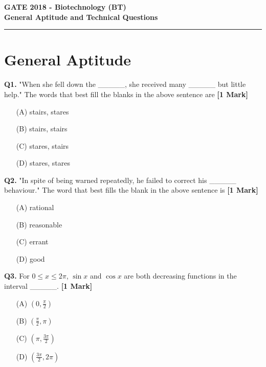 \documentclass[11pt]{article}
\newcommand{\questiona}[2]{
    \noindent\textbf{Q#2.} #1 \hfill \textbf{[1 Mark]}
}
\begin{document}
\begin{center}
    \Large\textbf{GATE 2018 - Biotechnology (BT)} \\
    \large\textbf{General Aptitude and Technical Questions} \\
    \rule{\textwidth}{0.5pt} %
\end{center}

\vspace{0.5cm}

\section*{General Aptitude}

\questiona{"When she fell down the \_\_\_\_\_, she received many \_\_\_\_\_ but little help." The words that best fill the blanks in the above sentence are}{1}
\begin{enumerate}
    \item[(A)] stairs, stares  
    \item[(B)] stairs, stairs  
    \item[(C)] stares, stairs  
    \item[(D)] stares, stares  
\end{enumerate}
\vspace{0.5cm}

\questiona{"In spite of being warned repeatedly, he failed to correct his \_\_\_\_\_ behaviour." The word that best fills the blank in the above sentence is}{2}
\begin{enumerate}
    \item[(A)] rational  
    \item[(B)] reasonable  
    \item[(C)] errant  
    \item[(D)] good  
\end{enumerate}
\vspace{0.5cm}

\questiona{For \(0 \leq x \leq 2\pi\), \(\sin x\) and \(\cos x\) are both decreasing functions in the interval \_\_\_\_\_.}{3}
\begin{enumerate}
    \item[(A)] \(\left(0, \frac{\pi}{2}\right)\)  
    \item[(B)] \(\left(\frac{\pi}{2}, \pi\right)\)  
    \item[(C)] \(\left(\pi, \frac{3\pi}{2}\right)\)  
    \item[(D)] \(\left(\frac{3\pi}{2}, 2\pi\right)\)  
\end{enumerate}
\vspace{0.5cm}
\end{document}
